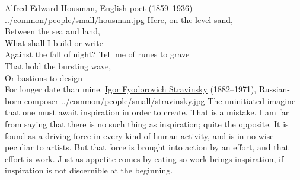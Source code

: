 ﻿%
\cleartooddpage%
\thispagestyle{empty}%
\mbox{}\vfill
{}
\begin{large}
\qboxnpqt
  {\href{http://en.wikipedia.org/wiki/Housman}{Alfred Edward Housman}, English poet (1859--1936)
    \footnotemark
  }{../common/people/small/housman.jpg}
  {Here, on the level sand, \\
    Between the sea and land, \\
    What shall I build or write \\
    Against the fall of night?
  }{Tell me of runes to grave \\
    That hold the bursting wave, \\
    Or bastions to design \\
    For longer date than mine.
  }
\vfill
\qboxnps
  {
    \href{http://en.wikipedia.org/wiki/Igor_Stravinsky}{Igor Fyodorovich Stravinsky}
    (1882--1971), Russian-born composer
    \footnotemark
  }{../common/people/small/stravinsky.jpg}
  {The uninitiated imagine that one must await inspiration in order to create.
   That is a mistake.
   I am far from saying that there is no such thing as inspiration;
   quite the opposite.
   It is found as a driving force in every kind of human activity, 
   and is in no wise peculiar to artists.
   But that force is brought into action by an effort, 
   and that effort is work.
   Just as appetite comes by eating so work brings inspiration, 
   if inspiration is not discernible at the beginning.
  }

\end{large}

